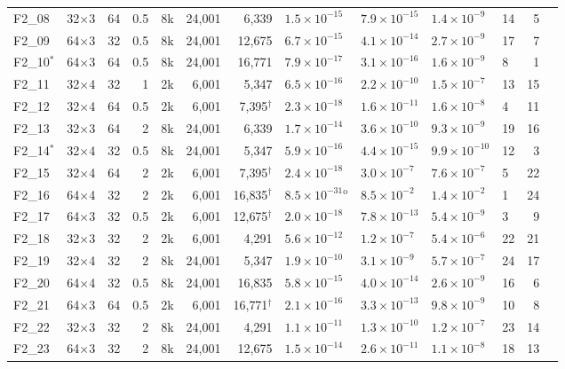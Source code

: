 \begin{table}[!htb]
\begin{tabular}{@{}llrrrrrllllrr@{}}
F2\_08 & 32$\times$3 & 64 & 0.5 & 8k & 24{,}001 & 6{,}339 & $1.5{\times}10^{-15}$ & $7.9{\times}10^{-15}$ & $1.4{\times}10^{-9}$ & 14 & 5 \\
F2\_09 & 64$\times$3 & 32 & 0.5 & 8k & 24{,}001 & 12{,}675 & $6.7{\times}10^{-15}$ & $4.1{\times}10^{-14}$ & $2.7{\times}10^{-9}$ & 17 & 7 \\
F2\_10$^{\ast}$ & 64$\times$3 & 64 & 0.5 & 8k & 24{,}001 & 16{,}771 & $7.9{\times}10^{-17}$ & $3.1{\times}10^{-16}$ & $1.6{\times}10^{-9}$ & 8 & 1 \\
F2\_11 & 32$\times$4 & 32 & 1 & 2k & 6{,}001 & 5{,}347 & $6.5{\times}10^{-16}$ & $2.2{\times}10^{-10}$ & $1.5{\times}10^{-7}$ & 13 & 15 \\
F2\_12 & 32$\times$4 & 64 & 0.5 & 2k & 6{,}001 & 7{,}395$^{\dagger}$ & $2.3{\times}10^{-18}$ & $1.6{\times}10^{-11}$ & $1.6{\times}10^{-8}$ & 4 & 11 \\
F2\_13 & 32$\times$3 & 64 & 2 & 8k & 24{,}001 & 6{,}339 & $1.7{\times}10^{-14}$ & $3.6{\times}10^{-10}$ & $9.3{\times}10^{-9}$ & 19 & 16 \\
F2\_14$^{\ast}$ & 32$\times$4 & 32 & 0.5 & 8k & 24{,}001 & 5{,}347 & $5.9{\times}10^{-16}$ & $4.4{\times}10^{-15}$ & $9.9{\times}10^{-10}$ & 12 & 3 \\
F2\_15 & 32$\times$4 & 64 & 2 & 2k & 6{,}001 & 7{,}395$^{\dagger}$ & $2.4{\times}10^{-18}$ & $3.0{\times}10^{-7}$ & $7.6{\times}10^{-7}$ & 5 & 22 \\
F2\_16 & 64$\times$4 & 32 & 2 & 2k & 6{,}001 & 16{,}835$^{\dagger}$ & $8.5{\times}10^{-31}$$^{\mathrm{o}}$ & $8.5{\times}10^{-2}$ & $1.4{\times}10^{-2}$ & 1 & 24 \\
F2\_17 & 64$\times$3 & 32 & 0.5 & 2k & 6{,}001 & 12{,}675$^{\dagger}$ & $2.0{\times}10^{-18}$ & $7.8{\times}10^{-13}$ & $5.4{\times}10^{-9}$ & 3 & 9 \\
F2\_18 & 32$\times$3 & 32 & 2 & 2k & 6{,}001 & 4{,}291 & $5.6{\times}10^{-12}$ & $1.2{\times}10^{-7}$ & $5.4{\times}10^{-6}$ & 22 & 21 \\
F2\_19 & 32$\times$4 & 32 & 2 & 8k & 24{,}001 & 5{,}347 & $1.9{\times}10^{-10}$ & $3.1{\times}10^{-9}$ & $5.7{\times}10^{-7}$ & 24 & 17 \\
F2\_20 & 64$\times$4 & 32 & 0.5 & 8k & 24{,}001 & 16{,}835 & $5.8{\times}10^{-15}$ & $4.0{\times}10^{-14}$ & $2.6{\times}10^{-9}$ & 16 & 6 \\
F2\_21 & 64$\times$3 & 64 & 0.5 & 2k & 6{,}001 & 16{,}771$^{\dagger}$ & $2.1{\times}10^{-16}$ & $3.3{\times}10^{-13}$ & $9.8{\times}10^{-9}$ & 10 & 8 \\
F2\_22 & 32$\times$3 & 32 & 2 & 8k & 24{,}001 & 4{,}291 & $1.1{\times}10^{-11}$ & $1.3{\times}10^{-10}$ & $1.2{\times}10^{-7}$ & 23 & 14 \\
F2\_23 & 64$\times$3 & 32 & 2 & 8k & 24{,}001 & 12{,}675 & $1.5{\times}10^{-14}$ & $2.6{\times}10^{-11}$ & $1.1{\times}10^{-8}$ & 18 & 13 \\
\bottomrule
\end{tabular}
\end{table}
